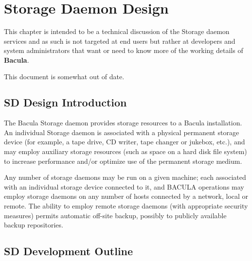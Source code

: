 
\chapter{Storage Daemon Design}
\label{_ChapterStart3}

This chapter is intended to be a technical discussion of the Storage daemon
services and as such is not targeted at end users but rather at developers and
system administrators that want or need to know more of the working details of
{\bf Bacula}. 

This document is somewhat out of date.

\section{SD Design Introduction}

The Bacula Storage daemon provides storage resources to a Bacula installation.
An individual Storage daemon is associated with a physical permanent storage
device (for example, a tape drive, CD writer, tape changer or jukebox, etc.),
and may employ auxiliary storage resources (such as space on a hard disk file
system) to increase performance and/or optimize use of the permanent storage
medium. 

Any number of storage daemons may be run on a given machine; each associated
with an individual storage device connected to it, and BACULA operations may
employ storage daemons on any number of hosts connected by a network, local or
remote. The ability to employ remote storage daemons (with appropriate
security measures) permits automatic off-site backup, possibly to publicly
available backup repositories. 

\section{SD Development Outline}

